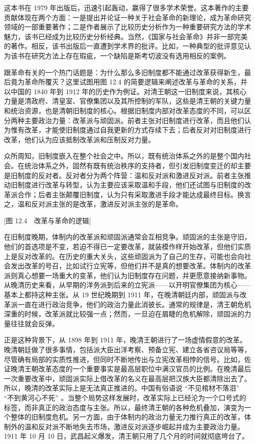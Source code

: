 这本书在 1979 年出版后，迅速引起轰动，赢得了很多学术荣誉。这本著作的主要贡献体现在两个方面：一是提出并论证一种关于社会革命的新理论，成为革命研究领域的一部重要著作；二是作者展示了比较历史分析作为一种重要研究方法的学术魅力，该书已经成为比较历史分析经典。当然，《国家与社会革命》并非一部完美的著作。相反，该书出版后一直遭到学术界的批评。比如，一种典型的批评意见认为该书在研究方法上存在瑕疵，一个缺陷是斯考切波没有选用相反的案例。

跟革命有关的一个热门话题是：为什么那么多旧制度都不能通过改革获得新生，最后竟为革命所覆灭？这里试图用图 12.4 的简要逻辑来阐述改革与革命的关系，并以中国的 1840 年到 1912 年的历史作为例证。对清王朝这一旧制度来说，其核心力量是清政府、清皇室、官僚集团以及其所控制的军队，这些是清王朝的关键力量和统治资源，也是清朝旧制度的核心。根据旧制度内部对改革态度的不同，可以区分两种主要政治力量：改革派与顽固派。前者主张对旧制度进行改革，而且他们认为惟有改革，才能使旧制度通过自我更新的方式存续下去；后者反对对旧制度进行改革，他们认为应该抵制改革派和压制反对力量。

众所周知，旧制度嵌入在整个社会之中。所以，既有统治体系之外的是整个国内社会。在统治体系之外，固然有既有统治秩序的支持者，但引发旧制度变迁的却主要是旧制度的反对者。反对者分为两个阵营：温和反对派和激进反对派。前者主张推动旧制度进行改革与转型，认为主要应该采取温和手段，他们还试图与旧制度的改革派合作；后者主张颠覆旧制度，认为只有采取激进手段才能达成最终目标。换言之，温和反对派主张的是改革，激进反对派主张的是革命。

[图 12.4　改革与革命的逻辑]

在旧制度晚期，体制内的改革派和顽固派通常会互相竞争。顽固派的主张是守旧，他们的首选项是不变，若迫不得已一定要改革，就装模作样开始改革，但他们实质上是反对改革的。在历史的重大关头，这些顽固派为了自己的生存，可能也会向社会发出改革的号召，比如试行立宪等，但他们并不是真的想要改革。体制内的改革派则真心想要一场重大的变革，他们认为旧制度存在问题，并更愿意接纳新事物。从晚清历史来看，从早期的洋务派到后来的立宪派——以开明官僚集团为核心——基本上都持这种主张。从 19 世纪晚期到 1911 年，在晚清朝廷内部，顽固派与改革派一直在进行政治竞争，他们的政治力量此消彼长。通常的规律是，清王朝危机深重的时候，改革派就比较强一点；然而，一旦迫在眉睫的危机解除，顽固派的力量往往就会反弹。

正是这种背景下，从 1898 年到 1911 年，晚清王朝进行了一场虚情假意的改革。晚清朝廷做了很多事情，包括派大臣出洋考察、预备立宪、建立各省咨议局等等，尽管确有局部的实质性推进，但同时不断地传出与立宪改革相悖的信号。比如，佐证晚清王朝改革态度的一个重要事实是最高层职位中满汉官员的比例。在晚清最后一次重要改革中，顽固派实际上借改革的名义在最高层把汉族大臣都清除出去了。所以，晚清的改革实际上是无法真正推进的。中国有俗语说 “不见棺材不落泪”  “不到黄河心不死” 。当整个局势这样发展时，改革实际上已经沦为一个口号式的标签，而非真正的政治态度与主张。所以，最终清王朝的各种危机叠加，演变为一个整体的旧制度危机。另一方面，由于体制内的政治力量无力推行真正的改革，体制外的温和反对派不断地失去市场，激进反对派逐步崛起并成为主要政治力量。1911 年 10 月 10 日，武昌起义爆发，清王朝只用了几个月的时间就彻底垮台了。

